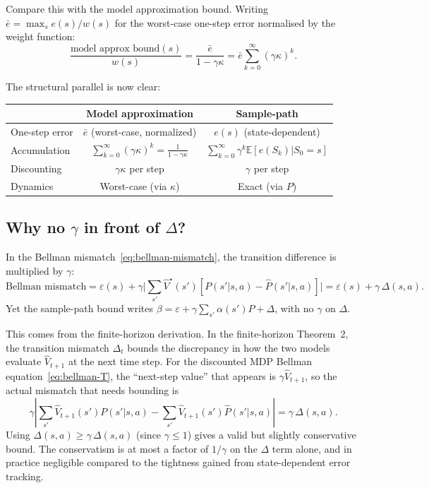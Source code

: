 \documentclass[11pt]{article}
\newcommand{\Vhatstar}{\hat V^\star}
\begin{document}
\medskip

\noindent
Compare this with the model approximation bound.  Writing $\bar{e} = \max_s e(s)/w(s)$
for the worst-case one-step error normalised by the weight function:
\begin{equation}\label{eq:model-approx-unrolled}
  \frac{\text{model approx bound}(s)}{w(s)}
  = \frac{\bar{e}}{1 - \gamma\kappa}
  = \bar{e} \sum_{k=0}^{\infty} (\gamma\kappa)^k.
\end{equation}

The structural parallel is now clear:

\begin{center}
\begin{tabular}{lcc}
\toprule
& Model approximation & Sample-path \\
\midrule
One-step error & $\bar{e}$ (worst-case, normalized) & $e(s)$ (state-dependent) \\
Accumulation & $\displaystyle\sum_{k=0}^{\infty} (\gamma\kappa)^k = \frac{1}{1-\gamma\kappa}$
  & $\displaystyle\sum_{k=0}^{\infty} \gamma^k \mathbb{E}[e(S_k) | S_0 = s]$ \\[10pt]
Discounting & $\gamma\kappa$ per step & $\gamma$ per step \\
Dynamics & Worst-case (via $\kappa$) & Exact (via $P$) \\
\bottomrule
\end{tabular}
\end{center}

\subsection{Why no $\gamma$ in front of $\Delta$?}

In the Bellman mismatch~\eqref{eq:bellman-mismatch}, the transition difference
is multiplied by $\gamma$:
\[
  \text{Bellman mismatch}
  = \varepsilon(s) + \gamma \bigl|\textstyle\sum_{s'} \Vhatstar(s') [P(s'|s,a) - \hat P(s'|s,a)]\bigr|
  = \varepsilon(s) + \gamma\,\Delta(s,a).
\]
Yet the sample-path bound writes $\beta = \varepsilon + \gamma\sum_{s'}\alpha(s')P + \Delta$,
with no $\gamma$ on $\Delta$.

This comes from the finite-horizon derivation.
In the finite-horizon Theorem~2, the transition mismatch $\Delta_t$
bounds the discrepancy in how the two models evaluate
$\hat{V}_{t+1}$ at the next time step.  For the discounted
MDP Bellman equation~\eqref{eq:bellman-T}, the ``next-step value'' that
appears is $\gamma \hat{V}_{t+1}$, so the actual
mismatch that needs bounding is
\[
  \gamma \left|\sum_{s'} \hat{V}_{t+1}(s') P(s'|s,a) - \sum_{s'} \hat{V}_{t+1}(s') \hat{P}(s'|s,a)\right|
  = \gamma \,\Delta(s,a).
\]
Using $\Delta(s,a) \ge \gamma\,\Delta(s,a)$ (since $\gamma \le 1$) gives a valid
but slightly conservative bound.  The conservatism is at most a factor of
$1/\gamma$ on the $\Delta$ term alone, and in practice negligible compared to
the tightness gained from state-dependent error tracking.
\end{document}
